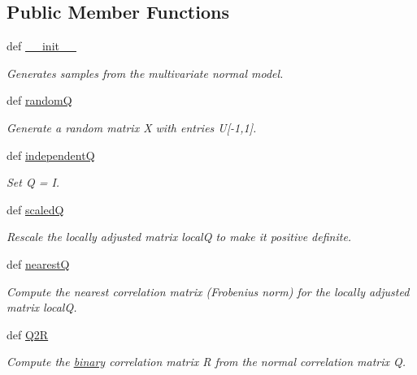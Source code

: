 \subsection*{Public Member Functions}
\begin{CompactItemize}
\item 
def \hyperlink{classgen_1_1binary__mn_b3ee86170c3b41948a15567440c68fac}{\_\-\_\-init\_\-\_\-}
\begin{CompactList}\small\item\em Generates samples from the multivariate normal model. \item\end{CompactList}\item 
def \hyperlink{classgen_1_1binary__mn_5c42384da221ad688d6e1a344606a017}{randomQ}
\begin{CompactList}\small\item\em Generate a random matrix X with entries U\mbox{[}-1,1\mbox{]}. \item\end{CompactList}\item 
def \hyperlink{classgen_1_1binary__mn_95f12365524907d99c52f77c36e53ba9}{independentQ}
\begin{CompactList}\small\item\em Set Q = I. \item\end{CompactList}\item 
def \hyperlink{classgen_1_1binary__mn_6e5ed2fe6e5b8c6540c797d4a49421bf}{scaledQ}
\begin{CompactList}\small\item\em Rescale the locally adjusted matrix localQ to make it positive definite. \item\end{CompactList}\item 
def \hyperlink{classgen_1_1binary__mn_98267c7b73f23c23331312345685bbee}{nearestQ}
\begin{CompactList}\small\item\em Compute the nearest correlation matrix (Frobenius norm) for the locally adjusted matrix localQ. \item\end{CompactList}\item 
def \hyperlink{classgen_1_1binary__mn_4d8919d948c2946f8c2f3a2467718ff9}{Q2R}
\begin{CompactList}\small\item\em Compute the \hyperlink{classgen_1_1binary}{binary} correlation matrix R from the normal correlation matrix Q. \item\end{CompactList}\item 

\end{CompactItemize}
